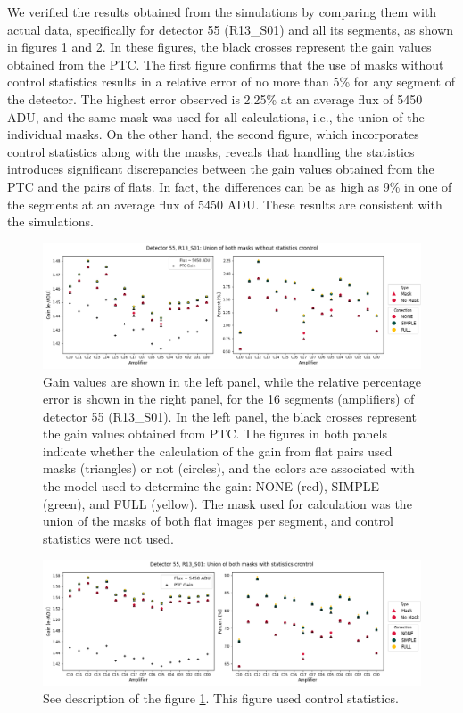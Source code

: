 We verified the results obtained from the simulations by comparing them with actual data, specifically for detector 55 (R13\_S01) and all its segments, as shown in figures \ref{fig:GainFlats_NOstats} and \ref{fig:GainFlats_stats}. In these figures, the black crosses represent the gain values obtained from the PTC. The first figure confirms that the use of masks without control statistics results in a relative error of no more than 5\% for any segment of the detector. The highest error observed is 2.25\% at an average flux of 5450 ADU, and the same mask was used for all calculations, i.e., the union of the individual masks. On the other hand, the second figure, which incorporates control statistics along with the masks, reveals that handling the statistics introduces significant discrepancies between the gain values obtained from the PTC and the pairs of flats. In fact, the differences can be as high as 9\% in one of the segments at an average flux of 5450 ADU. These results are consistent with the simulations.
 
 
\begin{figure}[!htb]
    \centering
    \includegraphics[width=\textwidth]{Figures/GainFlats_NOstats_det55.png}
    \caption{Gain values are shown in the left panel, while the relative percentage error is shown in the right panel, for the 16 segments (amplifiers) of detector 55 (R13\_S01). In the left panel, the black crosses represent the gain values obtained from PTC. The figures in both panels indicate whether the calculation of the gain from flat pairs used masks (triangles) or not (circles), and the colors are associated with the model used to determine the gain: NONE (red), SIMPLE (green), and FULL (yellow). The mask used for calculation was the union of the masks of both flat images per segment, and control statistics were not used.}
    \label{fig:GainFlats_NOstats}
\end{figure}

\begin{figure}[H]
    \centering
    \includegraphics[width=\textwidth]{Figures/GainFlats_stats_det55.png}
    \caption{See description of the figure \ref{fig:GainFlats_NOstats}. This figure used control statistics.}
    \label{fig:GainFlats_stats}
\end{figure}


